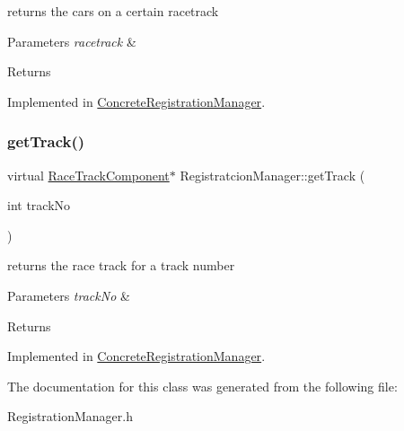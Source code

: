 returns the cars on a certain racetrack 
\begin{DoxyParams}{Parameters}
{\em racetrack} & \\
\hline
\end{DoxyParams}
\begin{DoxyReturn}{Returns}

\end{DoxyReturn}


Implemented in \mbox{\hyperlink{class_concrete_registration_manager_acea73f6efa6ec01052d3d43694405e66}{Concrete\+Registration\+Manager}}.

\mbox{\label{class_registratcion_manager_afc647bf31a1e48c6d6a4b5f1156f9649}} 
\subsubsection{\texorpdfstring{get\+Track()}{getTrack()}}
{\footnotesize\ttfamily virtual \mbox{\hyperlink{class_race_track_component}{Race\+Track\+Component}}$\ast$ Registratcion\+Manager\+::get\+Track (\begin{DoxyParamCaption}\item[{int}]{track\+No }\end{DoxyParamCaption})\hspace{0.3cm}{\ttfamily [pure virtual]}}

returns the race track for a track number 
\begin{DoxyParams}{Parameters}
{\em track\+No} & \\
\hline
\end{DoxyParams}
\begin{DoxyReturn}{Returns}

\end{DoxyReturn}


Implemented in \mbox{\hyperlink{class_concrete_registration_manager_a0a6cb4186150d569ac883c66860a52ef}{Concrete\+Registration\+Manager}}.



The documentation for this class was generated from the following file\+:\begin{DoxyCompactItemize}
\item 
Registration\+Manager.\+h\end{DoxyCompactItemize}
